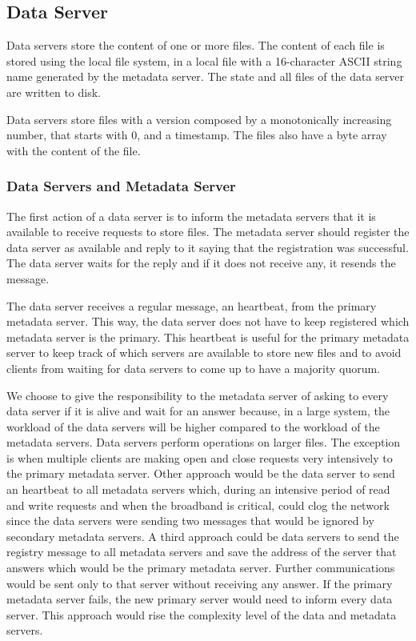 \subsection{Data Server}

Data servers store the content of one or more files. The content of each
file is stored using the local file system, in a local file with a
16-character ASCII string name generated by the metadata server. The
state and all files of the data server are written to disk.

Data servers store files with a version composed by a
monotonically increasing number, that starts with 0, and a timestamp.
The files also have a byte array with the content of the file.

\subsubsection{Data Servers and Metadata Server}

The first action of a data server is to inform the metadata servers that
it is available to receive requests to store files. The metadata
server should register the data server as available and reply to it saying 
that the registration was successful. The data server waits for the
reply and if it does not receive any, it resends the message.

The data server receives a regular message, an heartbeat, from the primary
metadata server. This way, the data server does not have to keep
registered which metadata server is the primary.
This heartbeat is useful for the primary metadata server to keep track of
which servers are available to store new files and to avoid clients
from waiting for data servers to come up to have a majority quorum.

We choose to give the responsibility to the metadata server of asking to
every data server if it is alive and wait for an answer because, in a large
system, the workload of the data servers will be higher compared to the
workload of the metadata servers. Data servers perform operations on larger
files. The exception is when multiple clients are making open and close
requests very intensively to the primary metadata server. Other approach
would be the data server to send an heartbeat to all metadata servers which,
during an intensive period of read and write requests and when the broadband
is critical, could clog the network since the data servers were sending two
messages that would be ignored by secondary metadata servers.
A third approach could be data servers to send the registry message to all
metadata servers and save the address of the server that answers which 
would be the primary metadata server. Further communications would be sent 
only to that server without receiving any answer. If the primary
metadata server fails, the new primary server would need to inform every data
server. This approach would rise the complexity level of the data and
metadata servers.

